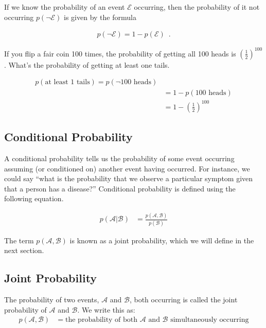 \documentclass{tufte-handout}
\begin{document}
\noindent If we know the probability of an event $\mathcal{E}$ occurring, then the probability of it not occurring $p(\neg \mathcal{E})$ is given by the formula

\begin{align}
p(\neg \mathcal{E}) = 1 - p(\mathcal{E}) \enspace .
\end{align}

\begin{exercise}
If you flip a fair coin 100 times, the probability of getting all 100 heads is $\left ( \frac{1}{2} \right)^{100}$.  What's the probability of getting at least one tails.
\begin{boxedsolution}
\begin{align}
p(\mbox{at least 1 tails}) = p(\neg \mbox{100 heads}) \nonumber \\
&= 1 - p(\mbox{100 heads}) \nonumber \\
&= 1 - \left ( \frac{1}{2} \right)^{100}\nonumber
\end{align}
\end{boxedsolution}

\end{exercise}

\subsection{Conditional Probability}
A conditional probability tells us the probability of some event occurring assuming (or conditioned on) another event having occurred.  For instance, we could say ``what is the probability that we observe a particular symptom given that a person has a disease?''  Conditional probability is defined using the following equation.

\begin{align}
p(\mathcal{A}|\mathcal{B}) &= \frac{p(\mathcal{A}, \mathcal{B})}{p(\mathcal{B})}
\end{align}

The term $p(\mathcal{A}, \mathcal{B})$ is known as a joint probability, which we will define in the next section.

\subsection{Joint Probability}
The probability of two events, $\mathcal{A}$ and $\mathcal{B}$, both occurring is called the joint probability of $\mathcal{A}$ and $\mathcal{B}$.  We write this as:
\begin{align}
p(\mathcal{A}, \mathcal{B}) &= \mbox{the probability of both $\mathcal{A}$ and $\mathcal{B}$ simultaneously occurring}
\end{align}
\end{document}

